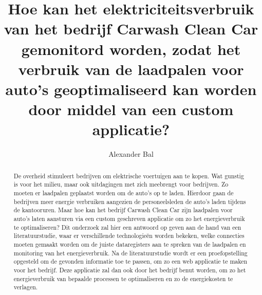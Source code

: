 \documentclass{hogent-article}
\title{Hoe kan het elektriciteitsverbruik van het bedrijf Carwash Clean Car gemonitord worden, zodat het verbruik van de laadpalen voor auto's geoptimaliseerd kan worden door middel van een custom applicatie?}
\author{Alexander Bal}
\begin{document}
\begin{abstract}
  De overheid stimuleert bedrijven om elektrische voertuigen aan te kopen. Wat gunstig is voor het milieu, maar ook uitdagingen met zich meebrengt voor bedrijven. Zo moeten er laadpalen geplaatst worden om de auto's op te laden. Hierdoor gaan de bedrijven meer energie verbruiken aangezien de personeelsleden de  auto's laden tijdens de kantooruren. Maar hoe kan het bedrijf Carwash Clean Car zijn laadpalen voor auto's laten aansturen via een custom geschreven applicatie om zo het energieverbruik te optimaliseren? Dit onderzoek zal hier een antwoord op geven aan de hand van een literatuurstudie, waar er verschillende technologieën worden bekeken, welke connecties moeten gemaakt worden om de juiste dataregisters aan te spreken van de laadpalen en monitoring van het energieverbruik. Na de literatuurstudie wordt er een proefopstelling opgesteld om de gevonden informatie toe te passen, om zo een web applicatie te maken voor het bedrijf. Deze applicatie zal dan ook door het bedrijf benut worden, om zo het energieverbruik van bepaalde processen te optimaliseren en zo de energiekosten te verlagen.
\end{abstract}

\tableofcontents



\printbibliography[heading=bibintoc]
\end{document}
